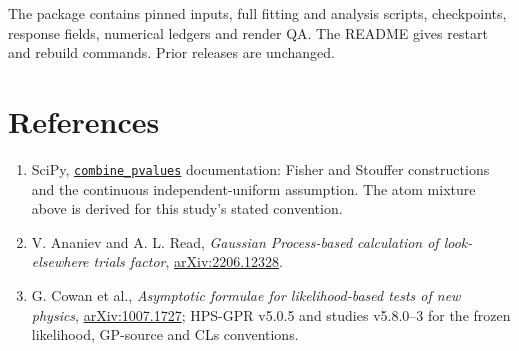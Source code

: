 \documentclass[11pt]{article}
\newcommand{\heading}[1]{\section*{\color{navy}#1}}
\begin{document}
{The package contains pinned inputs, full fitting and analysis scripts, checkpoints, response fields, numerical ledgers and render QA. The README gives restart and rebuild commands. Prior releases are unchanged.

\heading{References}
\begin{enumerate}\small
\item SciPy, \href{https://docs.scipy.org/doc/scipy/reference/generated/scipy.stats.combine_pvalues.html}{\texttt{combine\_pvalues}} documentation: Fisher and Stouffer constructions and the continuous independent-uniform assumption. The atom mixture above is derived for this study's stated convention.
\item V. Ananiev and A. L. Read, \textit{Gaussian Process-based calculation of look-elsewhere trials factor}, \href{https://arxiv.org/pdf/2206.12328}{arXiv:2206.12328}.
\item G. Cowan et al., \textit{Asymptotic formulae for likelihood-based tests of new physics}, \href{https://arxiv.org/abs/1007.1727}{arXiv:1007.1727}; HPS-GPR v5.0.5 and studies v5.8.0--3 for the frozen likelihood, GP-source and CLs conventions.
\end{enumerate}
}
\end{document}
